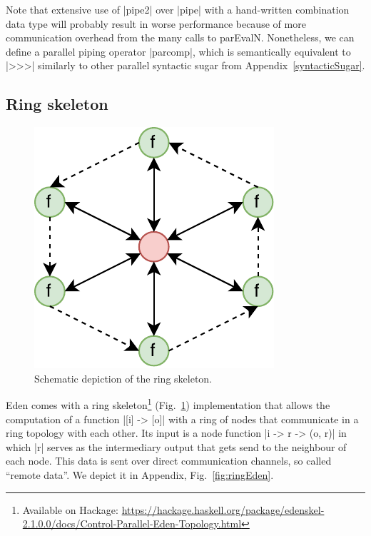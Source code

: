 Note that extensive use of |pipe2| over |pipe| with a hand-written combination data type will probably result in worse performance because of more communication overhead from the many calls to parEvalN. Nonetheless, we can define a parallel piping operator |parcomp|, which is semantically equivalent to |>>>| similarly to other parallel syntactic sugar from Appendix~\ref{syntacticSugar}.

\subsection{Ring skeleton} \label{sec:ring}
\begin{figure}[h]
	\includegraphics[scale=0.75]{images/ring}
	\caption{Schematic depiction of the ring skeleton.}
	\label{fig:ringImg}
\end{figure}
Eden comes with a ring skeleton\footnote{Available on Hackage: \url{https://hackage.haskell.org/package/edenskel-2.1.0.0/docs/Control-Parallel-Eden-Topology.html}} (Fig.~\ref{fig:ringImg}) implementation that allows the computation of a function |[i] -> [o]| with a ring of nodes that communicate in a ring topology with each other. Its input is a node function |i -> r -> (o, r)| in which |r| serves as the intermediary output that gets send to the neighbour of each node. This data is sent over direct communication channels, so called \enquote{remote data}. We depict it in Appendix, Fig.~\ref{fig:ringEden}.


